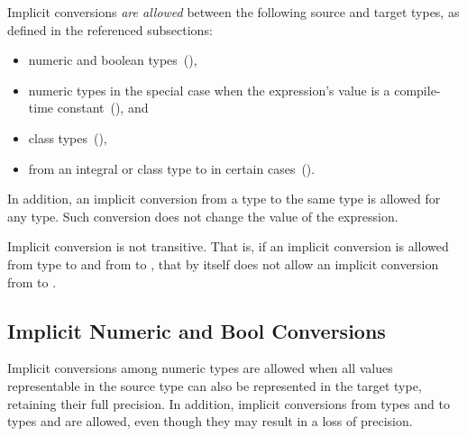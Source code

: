 Implicit conversions \emph{are allowed} between
the following source and target types,
as defined in the referenced subsections:

\begin{itemize}
\item numeric and boolean types~(),
\item numeric types in the special case when the expression's value
      is a compile-time constant~(), and
\item class types~(),
\item from an integral or class type to 
      in certain cases~().
\end{itemize}

In addition,
an implicit conversion from a type to the same type is allowed for any type.
Such conversion does not change the value of the expression.


Implicit conversion is not transitive. That is, if an implicit conversion
is allowed from type  to  and from  to ,
that by itself does not allow an implicit conversion
from  to .

\subsection{Implicit Numeric and Bool Conversions}
\label{Implicit_NumBool_Conversions}

Implicit conversions among numeric types are allowed when
all values representable in the source type can also be represented
in the target type, retaining their full precision.
%
%
In addition, implicit conversions from
types  and  to types 
and  are allowed, even though they may result in a loss of
precision.


